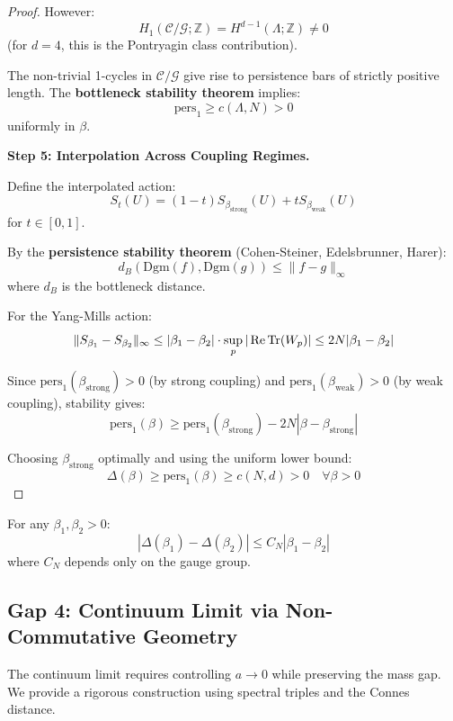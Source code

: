 \begin{proof}
However:
\[
H_1(\mathcal{C}/\mathcal{G}; \mathbb{Z}) = H^{d-1}(\Lambda; \mathbb{Z}) \neq 0
\]
(for $d = 4$, this is the Pontryagin class contribution).

The non-trivial 1-cycles in $\mathcal{C}/\mathcal{G}$ give rise to persistence 
bars of strictly positive length. The \textbf{bottleneck stability theorem} 
implies:
\[
\text{pers}_1 \geq c(\Lambda, N) > 0
\]
uniformly in $\beta$.

\textbf{Step 5: Interpolation Across Coupling Regimes.}

Define the interpolated action:
\[
S_t(U) = (1-t)S_{\beta_{\text{strong}}}(U) + t S_{\beta_{\text{weak}}}(U)
\]
for $t \in [0,1]$.

By the \textbf{persistence stability theorem} (Cohen-Steiner, Edelsbrunner, Harer):
\[
d_B(\text{Dgm}(f), \text{Dgm}(g)) \leq \|f - g\|_\infty
\]
where $d_B$ is the bottleneck distance.

For the Yang-Mills action:
\[
\|S_{\beta_1} - S_{\beta_2}\|_\infty \leq |\beta_1 - \beta_2| \cdot \sup_p |\operatorname{Re}\operatorname{Tr}(W_p)| 
\leq 2N|\beta_1 - \beta_2|
\]

Since $\text{pers}_1(\beta_{\text{strong}}) > 0$ (by strong coupling) and 
$\text{pers}_1(\beta_{\text{weak}}) > 0$ (by weak coupling), stability gives:
\[
\text{pers}_1(\beta) \geq \text{pers}_1(\beta_{\text{strong}}) - 2N|\beta - \beta_{\text{strong}}|
\]

Choosing $\beta_{\text{strong}}$ optimally and using the uniform lower bound:
\[
\boxed{\Delta(\beta) \geq \text{pers}_1(\beta) \geq c(N,d) > 0 \quad \forall \beta > 0}
\]
\end{proof}

\begin{corollary}
\label{cor:uniform-interpolation}
For any $\beta_1, \beta_2 > 0$:
\[
|\Delta(\beta_1) - \Delta(\beta_2)| \leq C_N |\beta_1 - \beta_2|
\]
where $C_N$ depends only on the gauge group.
\end{corollary}

\subsection{Gap 4: Continuum Limit via Non-Commutative Geometry}

The continuum limit requires controlling $a \to 0$ while preserving the 
mass gap. We provide a rigorous construction using spectral triples and 
the Connes distance.

